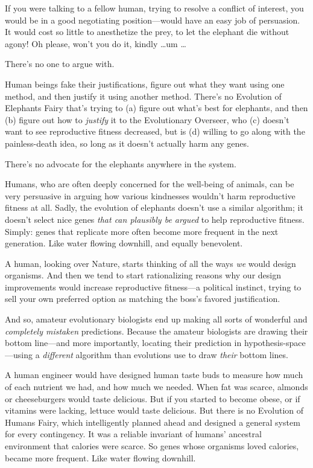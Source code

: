 {
 If you were talking to a fellow human, trying to resolve a
conflict of interest, you would be in a good negotiating
position---would have an easy job of persuasion. It would cost so
little to anesthetize the prey, to let the elephant die without agony!
Oh please, won't you do it, kindly \ldots um \ldots}

{
 There's no one to argue with.}

{
 Human beings fake their justifications, figure out what they want
using one method, and then justify it using another method.
There's no Evolution of Elephants Fairy
that's trying to (a) figure out what's
best for elephants, and then (b) figure out how to \textit{justify} it
to the Evolutionary Overseer, who (c) doesn't want to
see reproductive fitness decreased, but is (d) willing to go along with
the painless-death idea, so long as it doesn't actually
harm any genes.}

{
 There's no advocate for the elephants anywhere in
the system.}

{
 Humans, who are often deeply concerned for the well-being of
animals, can be very persuasive in arguing how various kindnesses
wouldn't harm reproductive fitness at all. Sadly, the
evolution of elephants doesn't use a similar algorithm;
it doesn't select nice genes \textit{that can plausibly
be argued} to help reproductive fitness. Simply: genes that replicate
more often become more frequent in the next generation. Like water
flowing downhill, and equally benevolent.}

{
 A human, looking over Nature, starts thinking of all the ways
\textit{we} would design organisms. And then we tend to start
rationalizing reasons why our design improvements would increase
reproductive fitness---a political instinct, trying to sell your own
preferred option as matching the boss's favored
justification.}

{
 And so, amateur evolutionary biologists end up making all sorts of
wonderful and \textit{completely mistaken} predictions. Because the
amateur biologists are drawing their bottom line---and more
importantly, locating their prediction in hypothesis-space---using a
\textit{different} algorithm than evolutions use to draw \textit{their}
bottom lines.}

{
 A human engineer would have designed human taste buds to measure
how much of each nutrient we had, and how much we needed. When fat was
scarce, almonds or cheeseburgers would taste delicious. But if you
started to become obese, or if vitamins were lacking, lettuce would
taste delicious. But there is no Evolution of Humans Fairy, which
intelligently planned ahead and designed a general system for every
contingency. It was a reliable invariant of humans'
ancestral environment that calories were scarce. So genes whose
organisms loved calories, became more frequent. Like water flowing
downhill.}

